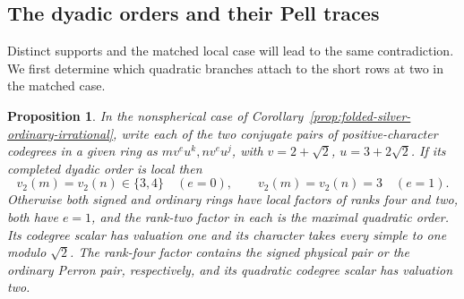 \documentclass[11pt,reqno]{amsart}
\newtheorem{proposition}[theorem]{Proposition}
\theoremstyle{remark}\newtheorem{remark}[theorem]{Remark}
\numberwithin{equation}{section}
\begin{document}
\subsection{The dyadic orders and their Pell traces}
Distinct supports and the matched local case will lead to the same
contradiction. We first determine which quadratic branches attach to
the short rows at two in the matched case.

\begin{proposition}\label{prop:folded-silver-dyadic-planes}
In the nonspherical case of Corollary~\ref{prop:folded-silver-ordinary-irrational}, write each of the two conjugate pairs of positive-character codegrees in a given ring as $m v^e u^k,n v^e u^j$, with $v=2+\sqrt2$, $u=3+2\sqrt2$. If its completed dyadic order is local then
\[
 v_2(m)=v_2(n)\in\{3,4\}\quad(e=0),\qquad
 v_2(m)=v_2(n)=3\quad(e=1).
\]
Otherwise both signed and ordinary rings have local factors of ranks four and two, both have $e=1$, and the rank-two factor in each is the maximal quadratic order. Its codegree scalar has valuation one and its character takes every simple to one modulo $\sqrt2$. The rank-four factor contains the signed physical pair or the ordinary Perron pair, respectively, and its quadratic codegree scalar has valuation two.
\end{proposition}
\end{document}
